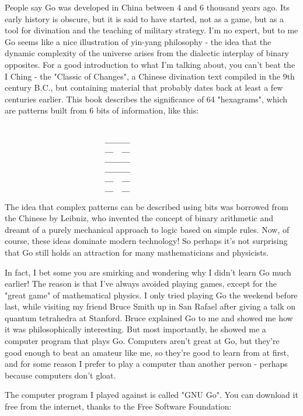 People say Go was developed in China between 4 and 6 thousand years ago.  
Its early history is obscure, but it is said to have started, not as a game, 
but as a tool for divination and the teaching of military strategy.   I'm 
no expert, but to me Go seems like a nice illustration of yin-yang 
philosophy - the idea that the dynamic complexity of the universe arises 
from the dialectic interplay of binary opposites.   For a good
introduction to what I'm talking about, you can't beat the I Ching - the
"Classic of Changes", a Chinese divination text compiled in the 9th century
B.C., but containing material that probably dates back at least a few
centuries earlier.   This book describes the significance of 64 "hexagrams", 
which are patterns built from 6 bits of information, like this:


\begin{verbatim}

                        ______
                        __  __
                        ______
                        ______
                        __  __
                        __  __
\end{verbatim}
    

The idea that complex patterns can be described using bits was borrowed
from the Chinese by Leibniz, who invented the concept of binary arithmetic
and dreamt of a purely mechanical approach to logic based on simple rules.
Now, of course, these ideas dominate modern technology!  So perhaps it's
not surprising that Go still holds an attraction for many mathematicians
and physicists.  

In fact, I bet some you are smirking and wondering why I didn't learn Go
much earlier!  The reason is that I've always avoided playing games,
except for the "great game" of mathematical physics.  I only tried
playing Go the weekend before last, while visiting my friend Bruce Smith
up in San Rafael after giving a talk on quantum tetrahedra at Stanford.  
Bruce explained Go to me and showed me how it was philosophically  
interesting.  But most importantly, he showed me a computer program
that plays Go.  Computers aren't great at Go, but they're good enough to
beat an amateur like me, so they're good to learn from at first, and for
some reason I prefer to play a computer than another person - perhaps because 
computers don't gloat.  

The computer program I played against is called "GNU Go".  You can download
it free from the internet, thanks to the Free Software Foundation:

